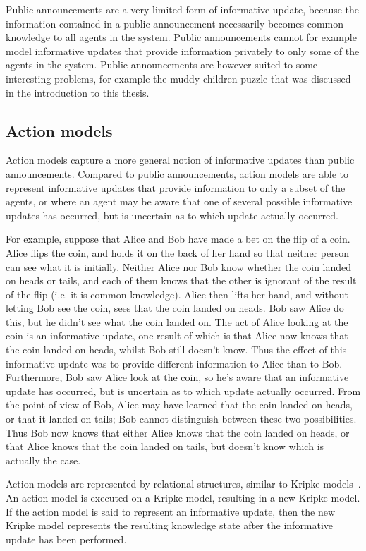 Public announcements are a very limited form of informative update, because the
information contained in a public announcement necessarily becomes common
knowledge to all agents in the system. Public announcements cannot for example
model informative updates that provide information privately to only some of
the agents in the system. Public announcements are however suited to some
interesting problems, for example the muddy children puzzle that was discussed
in the introduction to this thesis.

\subsection{Action models}\label{litreview-am}

Action models capture a more general notion of informative updates than public
announcements. Compared to public announcements, action models are able to
represent informative updates that provide information to only a subset of the
agents, or where an agent may be aware that one of several possible informative
updates has occurred, but is uncertain as to which update actually occurred. 

For example, suppose that Alice and Bob have made a bet on the flip of a coin.
Alice flips the coin, and holds it on the back of her hand so that neither
person can see what it is initially. Neither Alice nor Bob know whether the coin
landed on heads or tails, and each of them knows that the other is ignorant of
the result of the flip (i.e. it is common knowledge). Alice then lifts her hand,
and without letting Bob see the coin, sees that the coin landed on heads. Bob
saw Alice do this, but he didn't see what the coin landed on. The act of Alice
looking at the coin is an informative update, one result of which is that Alice
now knows that the coin landed on heads, whilst Bob still doesn't know. Thus the
effect of this informative update was to provide different information to Alice
than to Bob.  Furthermore, Bob saw Alice look at the coin, so he's aware that an
informative update has occurred, but is uncertain as to which update actually
occurred. From the point of view of Bob, Alice may have learned that the coin
landed on heads, or that it landed on tails; Bob cannot distinguish between
these two possibilities. Thus Bob now knows that either Alice knows that the
coin landed on heads, or that Alice knows that the coin landed on tails, but
doesn't know which is actually the case.

Action models are represented by relational structures, similar to Kripke
models~\cite{vanditmarsch2007dynamic}. An action model is executed on a Kripke
model, resulting in a new Kripke model. If the action model is said to represent
an informative update, then the new Kripke model represents the resulting
knowledge state after the informative update has been performed.

